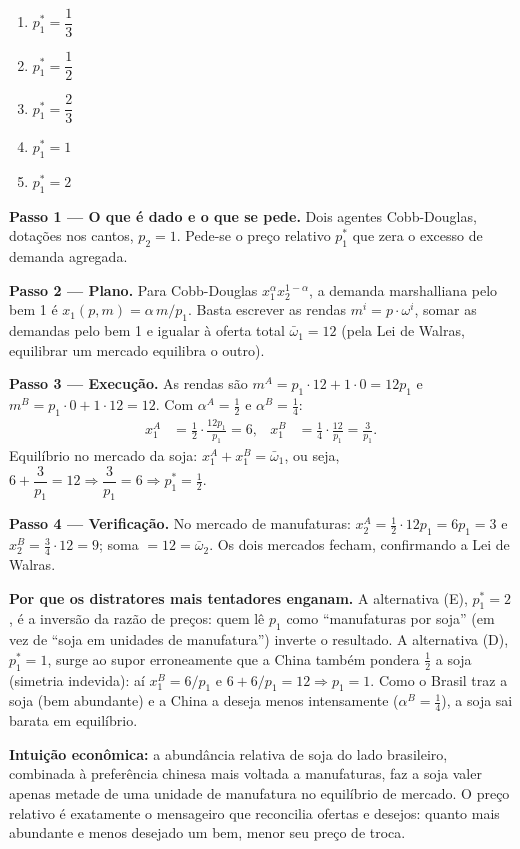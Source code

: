 \begin{enumerate}[label=\Alph*., leftmargin=3.2em, itemsep=0.15em, topsep=0.2em]
  \item $p_1^{*}=\dfrac{1}{3}$
  \item $p_1^{*}=\dfrac{1}{2}$
  \item $p_1^{*}=\dfrac{2}{3}$
  \item $p_1^{*}=1$
  \item $p_1^{*}=2$
\end{enumerate}
\begin{solucao}
\textbf{Passo 1 --- O que é dado e o que se pede.} Dois agentes Cobb-Douglas, dotações nos cantos, $p_2=1$. Pede-se o preço relativo $p_1^{*}$ que zera o excesso de demanda agregada.

\textbf{Passo 2 --- Plano.} Para Cobb-Douglas $x_1^{\alpha}x_2^{1-\alpha}$, a demanda marshalliana pelo bem 1 é $x_1(p,m)=\alpha\, m/p_1$. Basta escrever as rendas $m^i=p\cdot\omega^i$, somar as demandas pelo bem 1 e igualar à oferta total $\bar\omega_1=12$ (pela Lei de Walras, equilibrar um mercado equilibra o outro).

\textbf{Passo 3 --- Execução.} As rendas são $m^A=p_1\cdot 12 + 1\cdot 0 = 12p_1$ e $m^B=p_1\cdot 0 + 1\cdot 12 = 12$. Com $\alpha^A=\tfrac12$ e $\alpha^B=\tfrac14$:
\begin{align*}
x_1^A &= \tfrac12\cdot\frac{12p_1}{p_1}=6, & x_1^B &= \tfrac14\cdot\frac{12}{p_1}=\frac{3}{p_1}.
\end{align*}
Equilíbrio no mercado da soja: $x_1^A+x_1^B=\bar\omega_1$, ou seja, $6+\dfrac{3}{p_1}=12 \Rightarrow \dfrac{3}{p_1}=6 \Rightarrow p_1^{*}=\tfrac12$.

\textbf{Passo 4 --- Verificação.} No mercado de manufaturas: $x_2^A=\tfrac12\cdot 12p_1=6p_1=3$ e $x_2^B=\tfrac34\cdot 12=9$; soma $=12=\bar\omega_2$. Os dois mercados fecham, confirmando a Lei de Walras.

\textbf{Por que os distratores mais tentadores enganam.} A alternativa (E), $p_1^{*}=2$, é a inversão da razão de preços: quem lê $p_1$ como ``manufaturas por soja'' (em vez de ``soja em unidades de manufatura'') inverte o resultado. A alternativa (D), $p_1^{*}=1$, surge ao supor erroneamente que a China também pondera $\tfrac12$ a soja (simetria indevida): aí $x_1^B=6/p_1$ e $6+6/p_1=12\Rightarrow p_1=1$. Como o Brasil traz a soja (bem abundante) e a China a deseja menos intensamente ($\alpha^B=\tfrac14$), a soja sai barata em equilíbrio.

\textbf{Intuição econômica:} a abundância relativa de soja do lado brasileiro, combinada à preferência chinesa mais voltada a manufaturas, faz a soja valer apenas metade de uma unidade de manufatura no equilíbrio de mercado. O preço relativo é exatamente o mensageiro que reconcilia ofertas e desejos: quanto mais abundante e menos desejado um bem, menor seu preço de troca.
\end{solucao}

